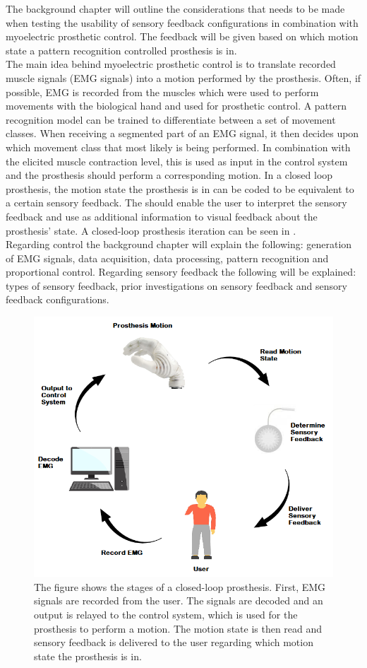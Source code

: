 The background chapter will outline the considerations that needs to be made when testing the usability of sensory feedback configurations in combination with myoelectric prosthetic control. The feedback will be given based on which motion state a pattern recognition controlled prosthesis is in. \\ 
The main idea behind myoelectric prosthetic control is to translate recorded muscle signals (EMG signals) into a motion performed by the prosthesis. Often, if possible, EMG is recorded from the muscles which were used to perform movements with the biological hand and used for prosthetic control. A pattern recognition model can be trained to differentiate between a set of movement classes. When receiving a segmented part of an EMG signal, it then decides upon which movement class that most likely is being performed. In combination with the elicited muscle contraction level, this is used as input in the control system and the prosthesis should perform a corresponding motion. \cite{Guanglin2010} In a closed loop prosthesis, the motion state the prosthesis is in can be coded to be equivalent to a certain sensory feedback. The should enable the user to interpret the sensory feedback and use as additional information to visual feedback about the prosthesis' state. \cite{Strbac2016} A closed-loop prosthesis iteration can be seen in . \\
Regarding control the background chapter will explain the following: generation of EMG signals, data acquisition, data processing, pattern recognition and proportional control. Regarding sensory feedback the following will be explained: types of sensory feedback, prior investigations on sensory feedback and sensory feedback configurations. 

\begin{figure}[H]                 
	\includegraphics[width=.65\textwidth]{figures/closed_loop_pros}  
	\caption{The figure shows the stages of a closed-loop prosthesis. First, EMG signals are recorded from the user. The signals are decoded and an output is relayed to the control system, which is used for the prosthesis to perform a motion. The motion state is then read and sensory feedback is delivered to the user regarding which motion state the prosthesis is in.}
	\label{fig:closed_loop_pros} 
\end{figure}